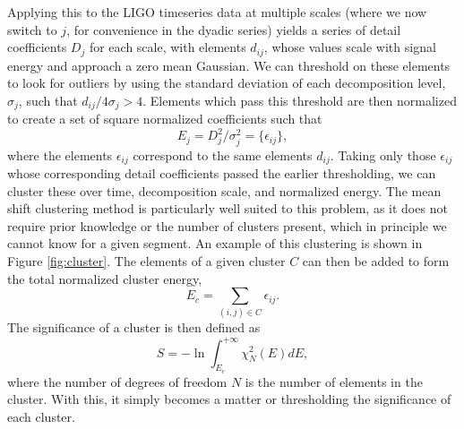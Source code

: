 \documentclass{article}
\begin{document}
Applying this to the LIGO timeseries data at multiple scales (where we now switch to $j$, for convenience in the dyadic series) yields a series of detail coefficients $D_{j}$ for each scale, with elements $d_{ij}$, whose values scale with signal energy and approach a zero mean Gaussian\citep{Blackburn2007}. We can threshold on these elements to look for outliers by using the standard deviation of each decomposition level, $\sigma_{j}$, such that $d_{ij}/4\sigma_{j} > 4$. Elements which pass this threshold are then normalized to create a set of square normalized coefficients such that
\begin{equation}
E_{j} = D_{j}^{2}/\sigma_{j}^{2} = \{\epsilon_{ij}\},
\end{equation}
where the elements $\epsilon_{ij}$ correspond to the same elements $d_{ij}$. Taking only those $\epsilon_{ij}$ whose corresponding detail coefficients passed the earlier thresholding, we can cluster these over time, decomposition scale, and normalized energy. The mean shift clustering method is particularly well suited to this problem, as it does not require prior knowledge or the number of clusters present\citep{Ivezic2014}, which in principle we cannot know for a given segment. An example of this clustering is shown in Figure \ref{fig:cluster}. The elements of a given cluster $C$ can then be added to form the total normalized cluster energy\citep{Blackburn2007},
\begin{equation}
E_{c} = \sum_{(i,j)\in C}\epsilon_{ij}. \label{eq:Ec}
\end{equation}
The significance of a cluster is then defined as\citep{Blackburn2007}
\begin{equation}
S=-\ln\int_{E_{c}}^{+\infty}\chi_{N}^{2}(E)dE, \label{eq:significance}
\end{equation}
where the number of degrees of freedom $N$ is the number of elements in the cluster. With this, it simply becomes a matter or thresholding the significance of each cluster.
\end{document}
